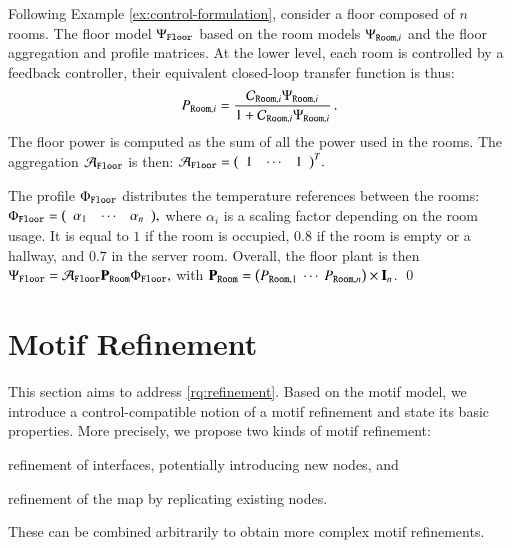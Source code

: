 \documentclass[runningheads]{llncs}
\newenvironment{textlist}{\begin{enumerate*}[label=(\emph{\roman*})]}{\end{enumerate*}}
\newcommand{\profile}[1][]{\Phi\ifx#1\relax\else^{#1}\fi}
\newcommand{\aggregation}[1][]{\mathcal{A}\ifx#1\relax\else^{#1}\fi}
\newcommand{\plant}[1][]{\Psi\ifx#1\relax\else^{#1}\fi}
\newcommand{\subplant}[1][]{P\ifx#1\relax\else^{#1}\fi}
\newcommand{\controller}[1][]{\mathcal{C}\ifx#1\relax\else^{#1}\fi}
\newcommand{\predicatename}[1]{\mathtt{#1}}
\begin{document}
\begin{example}
Following Example \ref{ex:control-formulation}, 
consider a floor composed of $n$ rooms. 
The floor model \( \plant_\predicatename{Floor}\) based on the room models \( \plant_{\predicatename{Room},i} \) and the floor aggregation and profile matrices. 
At the lower level, each room is controlled by a feedback controller, their equivalent closed-loop transfer function is thus:
\[ \subplant_{\predicatename{Room},i} = \dfrac{\controller_{\predicatename{Room},i} \plant_{\predicatename{Room},i} }{1 + \controller_{\predicatename{Room},i} \plant_{\predicatename{Room},i}}\,. \] 
%
The floor power is computed as the sum of all the power used in the rooms.
The aggregation $\aggregation_\predicatename{Floor}$ is then:
$
\aggregation_\predicatename{Floor} =     
\bigl(\begin{array}{ccc} 1 & \cdots & 1 \end{array}\bigr)^T .
$

\noindent The profile $\profile_\predicatename{Floor}$ distributes the temperature references between the rooms: 
$
\profile_\predicatename{Floor} = \bigl(\begin{array}{ccc} \alpha_1 & \cdots & \alpha_n \end{array}\bigr),
$
where $\alpha_i$ is a scaling factor depending on the room usage.  It is equal to $1$ if the room is occupied, $0.8$ if the room is empty or a hallway, and $0.7$ in the server room.
%
Overall, the floor plant is then
$
\plant_\predicatename{Floor} = \aggregation_\predicatename{Floor} \mathbf{\subplant_{\predicatename{Room}}} \profile_\predicatename{Floor},  
$
with \( \mathbf{\subplant_{\predicatename{Room}}} = \left( \subplant_{\predicatename{Room},1} ~ \cdots ~ \subplant_{\predicatename{Room},n} \right)  \times \textbf{I}_n \).
%
\qed
\end{example}

\section{Motif Refinement}
\label{secn:def-refinement}
\label{secn:refinement}
This section aims to address \ref{rq:refinement}.  Based on the motif model, we introduce a control-compatible notion of a motif refinement and state its basic properties.
%
More precisely, we propose two kinds of motif refinement:
\begin{textlist}
\item refinement of interfaces, potentially introducing new nodes, and
\item refinement of the map by replicating existing nodes.
\end{textlist}
These can be combined arbitrarily to obtain more complex motif refinements.
\end{document}

